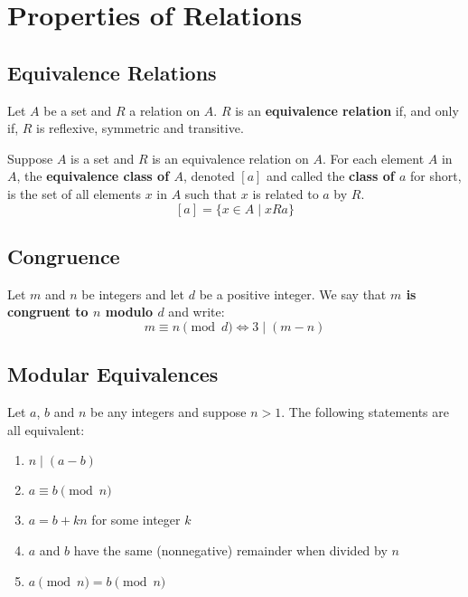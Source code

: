 
\section{Properties of Relations}

\subsection*{Equivalence Relations}

\begin{definition}
    Let $A$ be a set and $R$ a relation on $A$. $R$ is an \textbf{equivalence relation} if, and only if, $R$ is reflexive, symmetric and transitive.
\end{definition}

\begin{definition}
    Suppose $A$ is a set and $R$ is an equivalence relation on $A$. For each element $A$ in $A$, the \textbf{equivalence class of $A$}, denoted $[a]$ and called the \textbf{class of $a$} for short, is the set of all elements $x$ in $A$ such that $x$ is related to $a$ by $R$.
    $$ [a] = \{x\in A \mid  x R a\} $$
\end{definition}

\subsection*{Congruence}

\begin{definition}
    Let $m$ and $n$ be integers and let $d$ be a positive integer. We say that \textbf{$m$ is congruent to $n$ modulo $d$} and write:
    $$ m \equiv n \pmod{d} \iff 3 \mid (m-n) $$
\end{definition}

\subsection*{Modular Equivalences}

\begin{theorem}
    Let $a$, $b$ and $n$ be any integers and suppose $n>1$. The following statements are all equivalent:
    \begin{enumerate}
        \item $n\mid (a-b)$
        \item $a \equiv b \pmod{n}$
        \item $a = b + kn$ for some integer $k$
        \item $a$ and $b$ have the same (nonnegative) remainder when divided by $n$
        \item $a \pmod n = b \pmod n$
    \end{enumerate}
\end{theorem}

